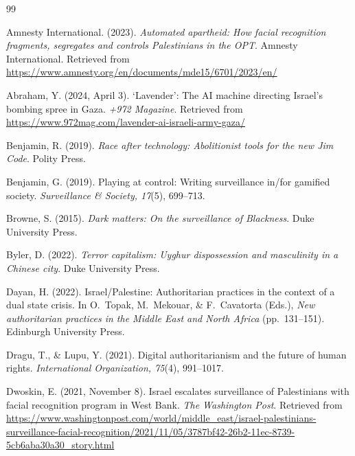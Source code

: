 \documentclass[11pt,a4paper]{article}
\theoremstyle{definition}
\theoremstyle{remark}
\theoremstyle{definition}
\begin{document}
\begin{thebibliography}{99}

Amnesty International. (2023).
\newblock \emph{Automated apartheid: How facial recognition fragments, segregates and controls Palestinians in the OPT}.
\newblock Amnesty International. Retrieved from \url{https://www.amnesty.org/en/documents/mde15/6701/2023/en/}

Abraham, Y. (2024, April 3).
\newblock `Lavender': The AI machine directing Israel's bombing spree in Gaza.
\newblock \emph{+972 Magazine}. Retrieved from \url{https://www.972mag.com/lavender-ai-israeli-army-gaza/}

Benjamin, R. (2019).
\newblock \emph{Race after technology: Abolitionist tools for the new Jim Code}.
\newblock Polity Press.

Benjamin, G. (2019).
\newblock Playing at control: Writing surveillance in/for gamified society.
\newblock \emph{Surveillance \& Society, 17}(5), 699--713.

Browne, S. (2015).
\newblock \emph{Dark matters: On the surveillance of Blackness}.
\newblock Duke University Press.

Byler, D. (2022).
\newblock \emph{Terror capitalism: Uyghur dispossession and masculinity in a Chinese city}.
\newblock Duke University Press.

Dayan, H. (2022).
\newblock Israel/Palestine: Authoritarian practices in the context of a dual state crisis.
\newblock In O.~Topak, M.~Mekouar, \& F.~Cavatorta (Eds.), \emph{New authoritarian practices in the Middle East and North Africa} (pp.~131--151).
\newblock Edinburgh University Press.

Dragu, T., \& Lupu, Y. (2021).
\newblock Digital authoritarianism and the future of human rights.
\newblock \emph{International Organization, 75}(4), 991--1017.

Dwoskin, E. (2021, November 8).
\newblock Israel escalates surveillance of Palestinians with facial recognition program in West Bank.
\newblock \emph{The Washington Post}. Retrieved from \url{https://www.washingtonpost.com/world/middle_east/israel-palestinians-surveillance-facial-recognition/2021/11/05/3787bf42-26b2-11ec-8739-5cb6aba30a30_story.html}


\end{thebibliography}
\end{document}
